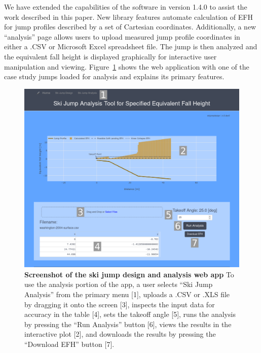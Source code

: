 \documentclass[smallextended]{svjour3}       %
\begin{document}
We have extended the capabilities of the software in version 1.4.0 to assist
the work described in this paper. New library features automate calculation of
EFH for jump profiles described by a set of Cartesian coordinates.
Additionally, a new ``analysis'' page allows users to upload measured jump
profile coordinates in either a .CSV or Microsoft Excel spreadsheet file. The
jump is then analyzed and the equivalent fall height is displayed graphically
for interactive user manipulation and viewing.
Figure~\ref{fig:web-app-screenshot} shows the web application with one of the
case study jumps loaded for analysis and explains its primary features.
%
\begin{figure}
  \centering
  \includegraphics[width=\columnwidth]{figures/web-app-screenshot.png}
  \caption{\textbf{Screenshot of the ski jump design and analysis web app} To
    use the analysis portion of the app, a user selects ``Ski Jump Analysis''
    from the primary menu [1], uploads a .CSV or .XLS file by dragging it onto
    the screen [3], inspects the input data for accuracy in the table [4], sets
    the takeoff angle [5], runs the analysis by pressing the ``Run Analysis''
    button [6], views the results in the interactive plot [2], and downloads
    the results by pressing the ``Download EFH'' button [7].}
  \label{fig:web-app-screenshot}
\end{figure}
\end{document}
